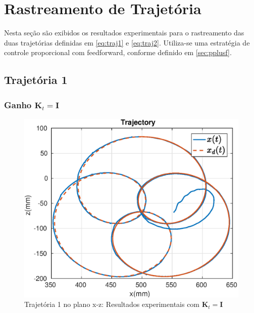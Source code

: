 \section{Rastreamento de Trajetória}

Nesta seção são exibidos os resultados experimentais para o rastreamento das duas trajetórias definidas em \eqref{eq:traj1} e \eqref{eq:traj2}. Utiliza-se uma estratégia de controle proporcional com feedforward, conforme definido em \ref{sec:pplusf}. 

\subsection{Trajetória 1}

\subsubsection{Ganho $\bm{K}_t = \bm{I}$}

\begin{figure}[H]
\centering
  \includegraphics[width=0.5\linewidth]{./img/traj_1_k1/traj.eps}
  \caption{Trajetória 1 no plano x-z: Resultados experimentais com $\bm{K}_t = \bm{I}$}
  \label{fig:sub1}
\end{figure}%

